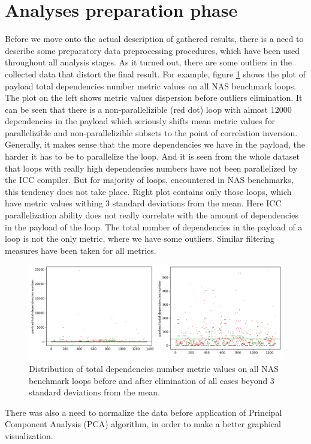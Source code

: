 \section{Analyses preparation phase}
\label{analysis-preparation-phase}
\qquad Before we move onto the actual description of gathered results, there is a need to describe some preparatory data preprocessing procedures, which have been used throughout all analysis stages. \newline  
\null\qquad As it turned out, there are some outliers in the collected data that distort the final result. For example, figure \ref{outliers-filtering} shows the plot of payload total dependencies number metric values on all NAS benchmark loops. The plot on the left shows metric values dispersion before outliers elimination. It can be seen that there is a non-parallelizible (red dot) loop with almost 12000 dependencies in the payload which seriously shifts mean metric values for parallelizible and non-parallelizible subsets to the point of correlation inversion. Generally, it makes sense that the more dependencies we have in the payload, the harder it has to be to parallelize the loop. And it is seen from the whole dataset that loops with really high dependencies numbers have not been parallelized by the ICC compiler. But for majority of loops, encountered in NAS benchmarks, this tendency does not take place. Right plot contains only those loops, which have metric values withing 3 standard deviations from the mean. Here ICC parallelization ability does not really correlate with the amount of dependencies in the payload of the loop. The total number of dependencies in the payload of a loop is not the only metric, where we have some outliers. Similar filtering measures have been taken for all metrics.   
\begin{figure}[h]
\centering
\includegraphics[width=\linewidth]{figs/outliers-filtering.png}
\caption{Distribution of total dependencies number metric values on all NAS benchmark loops before and after elimination of all cases beyond 3 standard deviations from the mean.}
\label{outliers-filtering}
\end{figure} \newline 
\null\qquad There was also a need to normalize the data before application of Principal Component Analysis (PCA) algorithm, in order to make a better graphical visualization.

